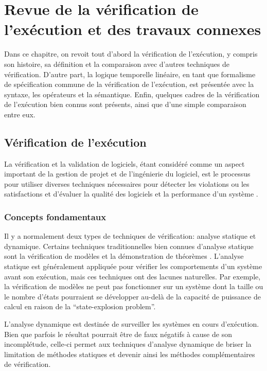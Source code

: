 
\chapter{Revue de la vérification de l'exécution et des travaux connexes}

Dans ce chapitre, on revoit tout d'abord la vérification de l'exécution, y compris son histoire, sa définition et la comparaison avec d'autres techniques de vérification. D'autre part, la logique temporelle linéaire, en tant que formalisme de spécification commune de la vérification de l'exécution, est présentée avec la syntaxe, les opérateurs et la sémantique. Enfin, quelques cadres de la vérification de l'exécution bien connus sont présents, ainsi que d'une simple comparaison entre eux.

\section{Vérification de l'exécution}

La vérification et la validation de logiciels, étant considéré comme un aspect important de la gestion de projet et de l'ingénierie du logiciel, est le processus pour utiliser diverses techniques nécessaires pour détecter les violations ou les satisfactions et d'évaluer la qualité des logiciels et la performance d'un système \citep{ieeestd2012}.

\subsection{Concepts fondamentaux}

Il y a normalement deux types de techniques de vérification: analyse statique et dynamique. Certains techniques traditionnelles bien connues d'analyse statique sont la vérification de modèles \citep{clarke1999model} et la démonstration de théorèmes \citep{heisel1990tactical}. L'analyse statique est généralement appliquée pour vérifier les comportements d'un système avant son exécution, mais ces techniques ont des lacunes naturelles. Par exemple, la vérification de modèles ne peut pas fonctionner sur un système dont la taille ou le nombre d'états pourraient se développer au-delà de la capacité de puissance de calcul en raison de la ``state-explosion problem''.

L'analyse dynamique est destinée de surveiller les systèmes en cours d'exécution. Bien que parfois le résultat pourrait être de faux négatifs à cause de son incomplétude, celle-ci permet aux techniques d'analyse dynamique de briser la limitation de méthodes statiques et devenir ainsi les méthodes complémentaires de vérification. \citep{falcone2013tutorial}

